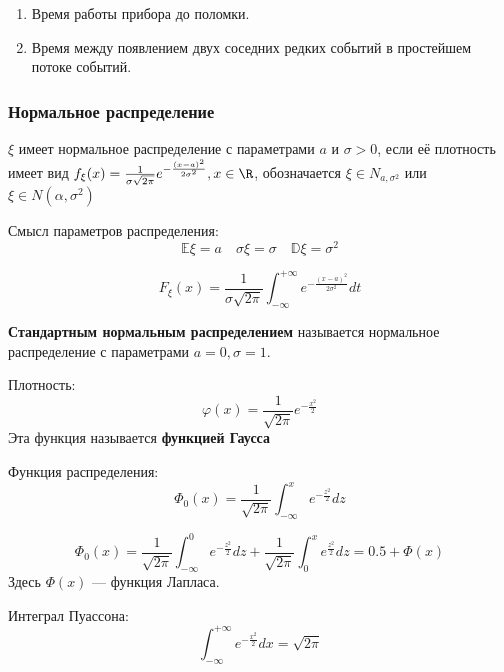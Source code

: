 \begin{example}\itemfix
    \begin{enumerate}
        \item Время работы прибора до поломки.
        \item Время между появлением двух соседних редких событий в простейшем потоке событий.
    \end{enumerate}
\end{example}

\subsubsection{Нормальное распределение}

\(\xi\) имеет нормальное распределение с параметрами \(a\) и \(\sigma > 0\), если её плотность имеет вид \(f_\xi(x) = \frac{1}{\sigma\sqrt{2\pi}} e^{ - \frac{(x - a)^2}{2\sigma^2}}, x\in\R\), обозначается \(\xi \in N_{a, \sigma^2}\) или \(\xi \in N(\alpha, \sigma^2)\)

Смысл параметров распределения:
\[\mathbb{E}\xi = a \quad \sigma \xi = \sigma \quad \mathbb{D}\xi = \sigma^2\]

\[F_\xi(x) = \frac{1}{\sigma \sqrt{2 \pi}} \int_{-\infty}^{+\infty} e^{ - \frac{(x - a)^2}{2\sigma^2} } dt\]

\begin{definition}
    \textbf{Стандартным нормальным распределением} называется нормальное распределение с параметрами \(a = 0, \sigma = 1\).

    Плотность:
    \[\varphi(x) = \frac{1}{\sqrt{2\pi}} e^{ - \frac{x^2}{2}}\]
    Эта функция называется \textbf{функцией Гаусса}
\end{definition}

Функция распределения:
\[\Phi_0(x) = \frac{1}{\sqrt{2\pi}} \int_{-\infty}^x e^{ - \frac{z^2}{2}} dz\]

\begin{remark}
    \[\Phi_0(x) = \frac{1}{\sqrt{2\pi}} \int_{-\infty}^0 e^{ - \frac{z^2}{2}} dz + \frac{1}{\sqrt{2\pi}} \int_0^x e^{\frac{z^2}{2}} dz = 0.5 + \Phi(x)\]
    Здесь \(\Phi(x)\) --- функция Лапласа.
\end{remark}

\begin{remark}
    Интеграл Пуассона:
    \[\int_{-\infty}^{+\infty} e^{ - \frac{x^2}{2}} dx = \sqrt{2\pi}\]
\end{remark}

